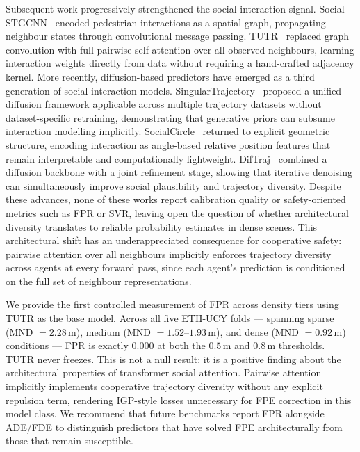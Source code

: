 \documentclass{article}
\begin{document}
Subsequent work progressively strengthened the social interaction signal.
Social-STGCNN~\cite{mohamed2020social} encoded pedestrian interactions as a
spatial graph, propagating neighbour states through convolutional message
passing.
TUTR~\cite{shi2023tutr} replaced graph convolution with full pairwise
self-attention over all observed neighbours, learning interaction weights
directly from data without requiring a hand-crafted adjacency kernel.
More recently, diffusion-based predictors have emerged as a third generation
of social interaction models.
SingularTrajectory~\cite{bae2024singular} proposed a unified diffusion
framework applicable across multiple trajectory datasets without
dataset-specific retraining, demonstrating that generative priors can
subsume interaction modelling implicitly.
SocialCircle~\cite{wong2024socialcircle} returned to explicit geometric
structure, encoding interaction as angle-based relative position features that
remain interpretable and computationally lightweight.
DifTraj~\cite{liu2024diftraj} combined a diffusion backbone with a joint
refinement stage, showing that iterative denoising can simultaneously improve
social plausibility and trajectory diversity.
Despite these advances, none of these works report calibration quality or
safety-oriented metrics such as FPR or SVR, leaving open the question of
whether architectural diversity translates to reliable probability estimates
in dense scenes.
This architectural shift has an underappreciated consequence for cooperative
safety: pairwise attention over all neighbours implicitly enforces trajectory
diversity across agents at every forward pass, since each agent's prediction
is conditioned on the full set of neighbour representations.

We provide the first controlled measurement of FPR across density tiers using
TUTR as the base model.
Across all five ETH-UCY folds --- spanning sparse (MND \(= 2.28\,\text{m}\)),
medium (MND \(= 1.52\)--\(1.93\,\text{m}\)), and dense
(MND \(= 0.92\,\text{m}\)) conditions --- FPR is exactly \(0.000\) at both the
\(0.5\,\text{m}\) and \(0.8\,\text{m}\) thresholds.
TUTR never freezes.
This is not a null result: it is a positive finding about the architectural
properties of transformer social attention.
Pairwise attention implicitly implements cooperative trajectory diversity
without any explicit repulsion term, rendering IGP-style losses unnecessary
for FPE correction in this model class.
We recommend that future benchmarks report FPR alongside ADE/FDE to distinguish
predictors that have solved FPE architecturally from those that remain
susceptible.
\end{document}
